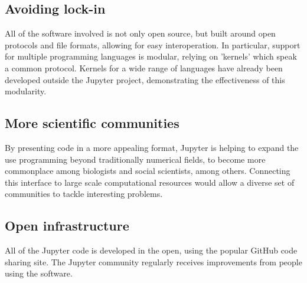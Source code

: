 
\subsection{Avoiding lock-in}

All of the software involved is not only open source, but built around open
protocols and file formats, allowing for easy interoperation. In particular,
support for multiple programming languages is modular, relying on 'kernels'
which speak a common protocol. Kernels for a wide range of languages have
already been developed outside the Jupyter project, demonstrating the
effectiveness of this modularity.


\subsection{More scientific communities}

By presenting code in a more appealing format, Jupyter is helping to expand
the use programming beyond traditionally numerical fields, to become more
commonplace among biologists and social scientists, among others. Connecting
this interface to large scale computational resources would allow a diverse set
of communities to tackle interesting problems.


\subsection{Open infrastructure}

All of the Jupyter code is developed in the open, using the popular GitHub
code sharing site. The Jupyter community regularly receives improvements from
people using the software.

